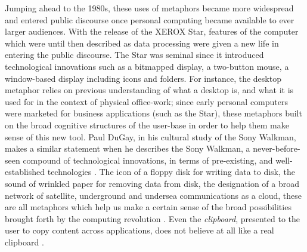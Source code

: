Jumping ahead to the 1980s, these uses of metaphors became more widespread and entered public discourse once personal computing became available to ever larger audiences. With the release of the XEROX Star, features of the computer which were until then described as data processing were given a new life in entering the public discourse. The Star was seminal since it introduced technological innovations such as a bitmapped display, a two-button mouse, a window-based display including icons and folders. For instance, the desktop metaphor relies on previous understanding of what a desktop is, and what it is used for in the context of physical office-work; since early personal computers were marketed for business applications (such as the Star), these metaphors built on the broad cognitive structures of the user-base in order to help them make sense of this new tool. Paul DuGay, in his cultural study of the Sony Walkman, makes a similar statement when he describes the Sony Walkman, a never-before-seen compound of technological innovations, in terms of pre-existing, and well-established technologies \citep{gay_doing_2013}. The icon of a floppy disk for writing data to disk, the sound of wrinkled paper for removing data from disk, the designation of a broad network of satellite, underground and undersea communications as a cloud, these are all metaphors which help us make a certain sense of the broad possibilities brought forth by the computing revolution \citep{wyatt_danger_2004}. Even the \emph{clipboard}, presented to the user to copy content across applications, does not believe at all like a real clipboard \citep{barrera_how_2022}.

